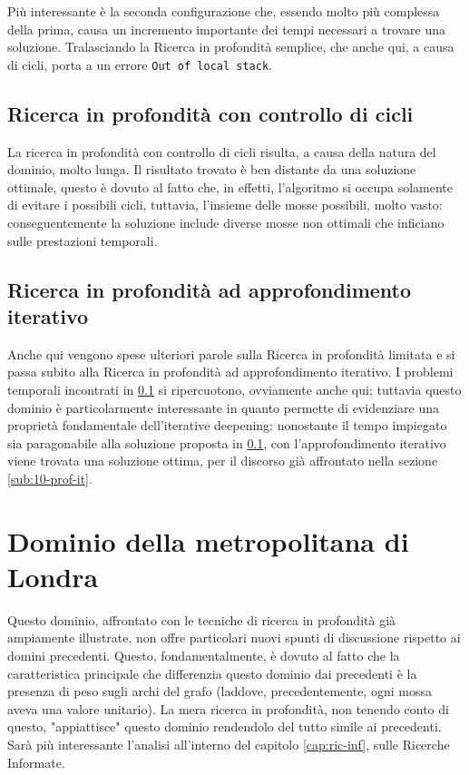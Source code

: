 Più interessante è la seconda configurazione che, essendo molto più complessa della prima, causa un incremento importante dei tempi necessari a trovare una soluzione. Tralasciando la Ricerca in profondità semplice, che anche qui, a causa di cicli, porta a un errore \texttt{Out of local stack}.

\subsection{Ricerca in profondità con controllo di cicli} \label{sub:blocchi-prof-cc}
La ricerca in profondità con controllo di cicli risulta, a causa della natura del dominio, molto lunga. Il risultato trovato è ben distante da una soluzione ottimale, questo è dovuto al fatto che, in effetti, l'algoritmo si occupa solamente di evitare i possibili cicli, tuttavia, l'insieme delle mosse possibili, molto vasto: conseguentemente la soluzione include diverse mosse non ottimali che inficiano sulle prestazioni temporali.

\subsection{Ricerca in profondità ad approfondimento iterativo} \label{sub:blocchi-prof-id}
Anche qui vengono spese ulteriori parole sulla Ricerca in profondità limitata e si passa subito alla Ricerca in profondità ad approfondimento iterativo. I problemi temporali incontrati in \ref{sub:blocchi-prof-cc} si ripercuotono, ovviamente anche qui; tuttavia questo dominio è particolarmente interessante in quanto permette di evidenziare una proprietà fondamentale dell'iterative deepening: nonostante il tempo impiegato sia paragonabile alla soluzione proposta in \ref{sub:blocchi-prof-cc}, con l'approfondimento iterativo viene trovata una soluzione ottima, per il discorso già affrontato nella sezione \ref{sub:10-prof-it}.

\section{Dominio della metropolitana di Londra} \label{sub:tube-prof}
Questo dominio, affrontato con le tecniche di ricerca in profondità già ampiamente illustrate, non offre particolari nuovi spunti di discussione rispetto ai domini precedenti. Questo, fondamentalmente, è dovuto al fatto che la caratteristica principale che differenzia questo dominio dai precedenti è la presenza di peso sugli archi del grafo (laddove, precedentemente, ogni mossa aveva una valore unitario). La mera ricerca in profondità, non tenendo conto di questo, "appiattisce" questo dominio rendendolo del tutto simile ai precedenti. Sarà più interessante l'analisi all'interno del capitolo \ref{cap:ric-inf}, sulle Ricerche Informate.
